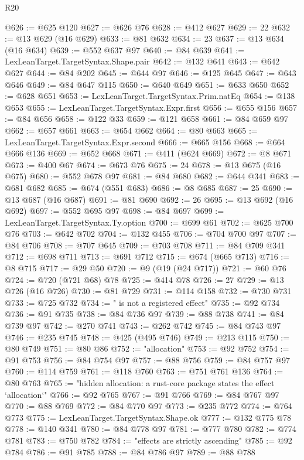 \begin{lexlean}{R20}
\begin{coremodule}
@626 := @625 @120
@627 := @626 @76
@628 := @412 @627
@629 := 22
@632 := @13 @629 (@16 @629)
@633 := @81 @632
@634 := 23
@637 := @13 @634 (@16 @634)
@639 := @552 @637 @97
@640 := @84 @639
@641 := LexLeanTarget.TargetSyntax.Shape.pair
@642 := @132 @641
@643 := @642 @627
@644 := @84 @202
@645 := @644 @97
@646 := @125 @645
@647 := @643 @646
@649 := @84 @647 @115
@650 := @640 @649
@651 := @633 @650
@652 := @628 @651
@653 := LexLeanTarget.TargetSyntax.Prim.natEq
@654 := @138 @653
@655 := LexLeanTarget.TargetSyntax.Expr.first
@656 := @655 @156
@657 := @84 @656
@658 := @122 @33
@659 := @121 @658
@661 := @84 @659 @97
@662 := @657 @661
@663 := @654 @662
@664 := @80 @663
@665 := LexLeanTarget.TargetSyntax.Expr.second
@666 := @665 @156
@668 := @664 @666 @136
@669 := @652 @668
@671 := @411 (@624 @669)
@672 := @8 @671
@673 := @400 @67
@674 := @673 @76
@675 := 24
@678 := @13 @675 (@16 @675)
@680 := @552 @678 @97
@681 := @84 @680
@682 := @644 @341
@683 := @681 @682
@685 := @674 (@551 @683)
@686 := @8 @685
@687 := 25
@690 := @13 @687 (@16 @687)
@691 := @81 @690
@692 := 26
@695 := @13 @692 (@16 @692)
@697 := @552 @695 @97
@698 := @84 @697
@699 := LexLeanTarget.TargetSyntax.Ty.option
@700 := @699 @61
@702 := @625 @700 @76
@703 := @642 @702
@704 := @132 @455
@706 := @704 @700 @97
@707 := @84 @706
@708 := @707 @645
@709 := @703 @708
@711 := @84 @709 @341
@712 := @698 @711
@713 := @691 @712
@715 := @674 (@665 @713)
@716 := @8 @715
@717 := @29 @50
@720 := @9 (@19 (@24 @717))
@721 := @60 @76
@724 := @720 (@721 @68) @78
@725 := @414 @78
@726 := 27
@729 := @13 @726 (@16 @726)
@730 := @81 @729
@731 := @114 @158
@732 := @730 @731
@733 := @725 @732
@734 := " is not a registered effect"
@735 := @92 @734
@736 := @91 @735
@738 := @84 @736 @97
@739 := @88 @738
@741 := @84 @739 @97
@742 := @270 @741
@743 := @262 @742
@745 := @84 @743 @97
@746 := @235 @745
@748 := @425 (@495 @746)
@749 := @213 @115
@750 := @80 @749
@751 := @80 @86
@752 := "allocation"
@753 := @92 @752
@754 := @91 @753
@756 := @84 @754 @97
@757 := @88 @756
@759 := @84 @757 @97
@760 := @114 @759
@761 := @118 @760
@763 := @751 @761 @136
@764 := @80 @763
@765 := "hidden allocation: a rust-core package states the effect `allocation`"
@766 := @92 @765
@767 := @91 @766
@769 := @84 @767 @97
@770 := @88 @769
@772 := @84 @770 @97
@773 := @235 @772
@774 := @764 @773
@775 := LexLeanTarget.TargetSyntax.Shape.ok
@777 := @132 @775 @78
@778 := @140 @341
@780 := @84 @778 @97
@781 := @777 @780
@782 := @774 @781
@783 := @750 @782
@784 := "effects are strictly ascending"
@785 := @92 @784
@786 := @91 @785
@788 := @84 @786 @97
@789 := @88 @788

\end{coremodule}
\end{lexlean}
